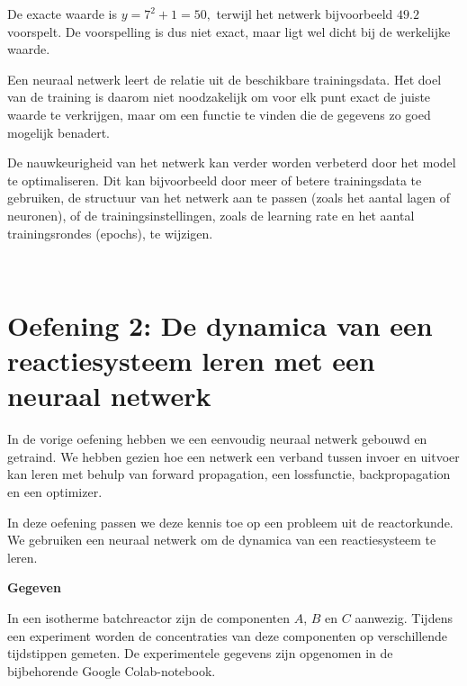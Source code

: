 \documentclass{ximera}
\begin{document}
\begin{question}
\begin{multipleChoice}

\end{multipleChoice}

\begin{feedback} \text{ }

De exacte waarde is $y=7^2+1=50,$
terwijl het netwerk bijvoorbeeld $49.2$ voorspelt. De voorspelling is dus niet exact, maar ligt wel dicht bij de werkelijke waarde.

Een neuraal netwerk leert de relatie uit de beschikbare trainingsdata. Het doel van de training is daarom niet noodzakelijk om voor elk punt exact de juiste waarde te verkrijgen, maar om een functie te vinden die de gegevens zo goed mogelijk benadert.

De nauwkeurigheid van het netwerk kan verder worden verbeterd door het model te optimaliseren. Dit kan bijvoorbeeld door meer of betere trainingsdata te gebruiken, de structuur van het netwerk aan te passen (zoals het aantal lagen of neuronen), of de trainingsinstellingen, zoals de learning rate en het aantal trainingsrondes (epochs), te wijzigen.

\end{feedback}

\end{question}

\text{ } \\

\section*{Oefening 2: De dynamica van een reactiesysteem leren met een neuraal netwerk}

In de vorige oefening hebben we een eenvoudig neuraal netwerk gebouwd en getraind. We hebben gezien hoe een netwerk een verband tussen invoer en uitvoer kan leren met behulp van forward propagation, een lossfunctie, backpropagation en een optimizer.

In deze oefening passen we deze kennis toe op een probleem uit de reactorkunde. We gebruiken een neuraal netwerk om de dynamica van een reactiesysteem te leren.

\textbf{Gegeven}

In een isotherme batchreactor zijn de componenten $A$, $B$ en $C$ aanwezig. Tijdens een experiment worden de concentraties van deze componenten op verschillende tijdstippen gemeten. De experimentele gegevens zijn opgenomen in de bijbehorende Google Colab-notebook.
\end{document}

